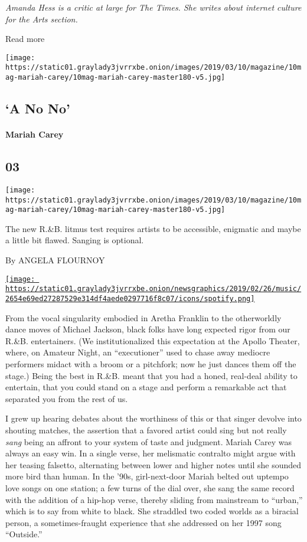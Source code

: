 \emph{Amanda Hess is a critic at large for The Times. She writes about
internet culture for the Arts section.}

Read more

\texttt{[image: https://static01.graylady3jvrrxbe.onion/images/2019/03/10/magazine/10mag-mariah-carey/10mag-mariah-carey-master180-v5.jpg]}

\hypertarget{--a-no-no}{%
\subsection{\texorpdfstring{ `A No No'}{  `A No No'}}\label{--a-no-no}}

\hypertarget{mariah-carey}{%
\paragraph{Mariah Carey}\label{mariah-carey}}

\hypertarget{03}{%
\subsection{03}\label{03}}

\texttt{[image: https://static01.graylady3jvrrxbe.onion/images/2019/03/10/magazine/10mag-mariah-carey/10mag-mariah-carey-master180-v5.jpg]}

The new R.\&B. litmus test requires artists to be accessible, enigmatic
and maybe a little bit flawed. Sanging is optional.

By ANGELA FLOURNOY

\href{https://open.spotify.com/track/7qg349cIMHC1syfpyQZtJ4}{\texttt{[image: https://static01.graylady3jvrrxbe.onion/newsgraphics/2019/02/26/music/2654e69ed27287529e314df4aede0297716f8c07/icons/spotify.png]}}

From the vocal singularity embodied in Aretha Franklin to the
otherworldly dance moves of Michael Jackson, black folks have long
expected rigor from our R.\&B. entertainers. (We institutionalized this
expectation at the Apollo Theater, where, on Amateur Night, an
``executioner'' used to chase away mediocre performers midact with a
broom or a pitchfork; now he just dances them off the stage.) Being the
best in R.\&B. meant that you had a honed, real-deal ability to
entertain, that you could stand on a stage and perform a remarkable act
that separated you from the rest of us.

I grew up hearing debates about the worthiness of this or that singer
devolve into shouting matches, the assertion that a favored artist could
sing but not really \emph{sang} being an affront to your system of taste
and judgment. Mariah Carey was always an easy win. In a single verse,
her melismatic contralto might argue with her teasing falsetto,
alternating between lower and higher notes until she sounded more bird
than human. In the '90s, girl-next-door Mariah belted out uptempo love
songs on one station; a few turns of the dial over, she sang the same
record with the addition of a hip-hop verse, thereby sliding from
mainstream to ``urban,'' which is to say from white to black. She
straddled two coded worlds as a biracial person, a sometimes-fraught
experience that she addressed on her 1997 song ``Outside.''

